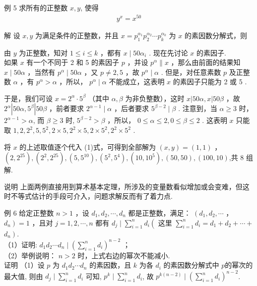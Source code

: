 例 5 求所有的正整数 $x, y$, 使得\\
\begin{align*}
y^{x}=x^{50}
\end{align*}

解 设 $x ,  y$ 为满足条件的正整数，并且 $x=p_{1}^{\alpha_{1}} p_{2}^{\alpha_{2}} \cdots p_{k}^{\alpha_{k}}$ 为 $x$ 的素因数分解式，则

由 $y$ 为正整数，知对 $1 \leqslant i \leqslant k$ ，都有 $x \mid 50 \alpha_{i}$ . 现在先讨论 $x$ 的素因子. \\
如果 $x$ 有一个不同于 2 和 5 的素因子 $p$ ，并设 $p^{\alpha} \| x$ ，那么由前面的结果知 $x \mid 50 \alpha$ ，当然有 $p^{\alpha} \mid 50 \alpha$ ，又 $p \neq 2 ,  5$ ，故 $p^{\alpha} \mid \alpha$ . 但是，对任意素数 $p$ 及正整数 $\alpha$ ，有 $p^{\alpha}>\alpha$ ，所以， $p^{\alpha} \mid \alpha$ 不能成立，这表明 $x$ 的素因子只能为 2 或 5 . 

于是，我们可设 $x=2^{\alpha} \cdot 5^{\beta}$ （其中 $\alpha ,  \beta$ 为非负整数），这时 $x|50 \alpha, x| 50 \beta$ ，故 $2^{\alpha}\left|50 \alpha, 5^{\beta}\right| 50 \beta$ ，前者要求 $2^{\alpha-1} \mid \alpha$ ，后者要求 $5^{\beta-2} \mid \beta$ . 注意到，当 $\alpha \geqslant 3$ 时， $2^{\alpha-1}>\alpha$, 而 $\beta \geqslant 3$ 时, $5^{\beta-2}>\beta$ ，所以， $0 \leqslant \alpha \leqslant 2,0 \leqslant \beta \leqslant 2$ . 这表明 $x$ 只能取 $1,2,2^{2}, 5,5^{2}, 2 \times 5,2^{2} \times 5,2 \times 5^{2}, 2^{2} \times 5^{2}$ . 

将 $x$ 的上述取值逐个代入 (1)式，可得到全部解为 $(x, y)=(1,1)$ ， $\left(2,2^{25}\right),\left(2^{2}, 2^{25}\right),\left(5,5^{10}\right),\left(5^{2}, 5^{4}\right),\left(10,10^{5}\right),(50,50),(100,10)$,共 8 组解.

说明 上面两例直接用到算术基本定理，所涉及的变量数看似增加或会变难，但这时不等式估计的手段可介入，问题求解反而有了着力点. 

例 6 给定正整数 $n>1$ ，设 $d_{1}, d_{2}, \cdots, d_{n}$ 都是正整数，满足： $\left(d_{1}, d_{2}, \cdots\right.$ ， $\left.d_{n}\right)=1$ ，且对 $j=1,2, \cdots, n$ 都有 $d_{j} \mid \sum_{i=1}^{n} d_{i}\left(\right.$ 这里 $\sum_{i=1}^{n} d_{i}=d_{1}+d_{2}+\cdots+$ $\left.d_{n}\right)$.\\
（1）证明: $d_{1} d_{2} \cdots d_{n} \mid\left(\sum_{i=1}^{n} d_{i}\right)^{n-2}$ ；\\
（2）举例说明： $n>2$ 时，上式右边的幂次不能减小.\\
证明 （1）设 $p$ 为 $d_{1} d_{2} \cdots d_{n}$ 的素因数，且 $k$ 为各 $d_{i}$ 的素因数分解式中 $p$的幂次的最大值, 则由 $d_{j} \mid \sum_{i=1}^{n} d_{i}$ 可知, $p^{k} \mid \sum_{i=1}^{n} d_{i}$, 故 $p^{k(n-2)} \mid\left(\sum_{i=1}^{n} d_{i}\right)^{n-2}$.

